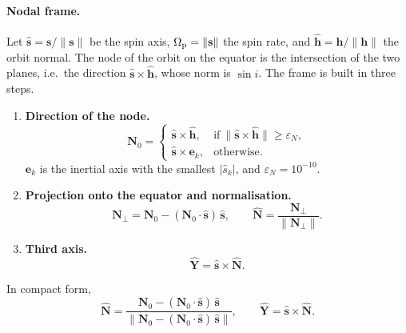 \paragraph{Nodal frame.} Let $\hat{\mathbf s}=\mathbf s/\|\mathbf s\|$ be the spin axis, $\Omega_{\mathrm p}=\|\mathbf s\|$ the spin rate, and $\hat{\mathbf h}=\mathbf h/\|\mathbf h\|$ the orbit normal. The node of the orbit on the equator is the intersection of the two planes, i.e.\ the direction $\hat{\mathbf s}\times\hat{\mathbf h}$, whose norm is $\sin i$. The frame is built in three steps.
\begin{enumerate}
  \item \textbf{Direction of the node.}
  \[
    \mathbf N_0=\begin{cases}\hat{\mathbf s}\times\hat{\mathbf h}, & \text{if}\ \|\hat{\mathbf s}\times\hat{\mathbf h}\|\ge\varepsilon_N,\\[1mm] \hat{\mathbf s}\times\mathbf e_k, & \text{otherwise}.\end{cases}
  \]
  $\mathbf e_k$ is the inertial axis with the smallest $|\hat s_k|$, and $\varepsilon_N=10^{-10}$.
  \item \textbf{Projection onto the equator and normalisation.}
  \[
    \mathbf N_\perp=\mathbf N_0-(\mathbf N_0\cdot\hat{\mathbf s})\,\hat{\mathbf s},\qquad
    \hat{\mathbf N}=\frac{\mathbf N_\perp}{\|\mathbf N_\perp\|}.
  \]
  \item \textbf{Third axis.}
  \[
    \hat{\mathbf Y}=\hat{\mathbf s}\times\hat{\mathbf N}.
  \]
\end{enumerate}
In compact form,
\begin{equation}
  \hat{\mathbf N}=\frac{\mathbf N_0-(\mathbf N_0\cdot\hat{\mathbf s})\,\hat{\mathbf s}}{\big\|\mathbf N_0-(\mathbf N_0\cdot\hat{\mathbf s})\,\hat{\mathbf s}\big\|},\qquad
  \hat{\mathbf Y}=\hat{\mathbf s}\times\hat{\mathbf N}. \label{eq:node-frame}
\end{equation}
